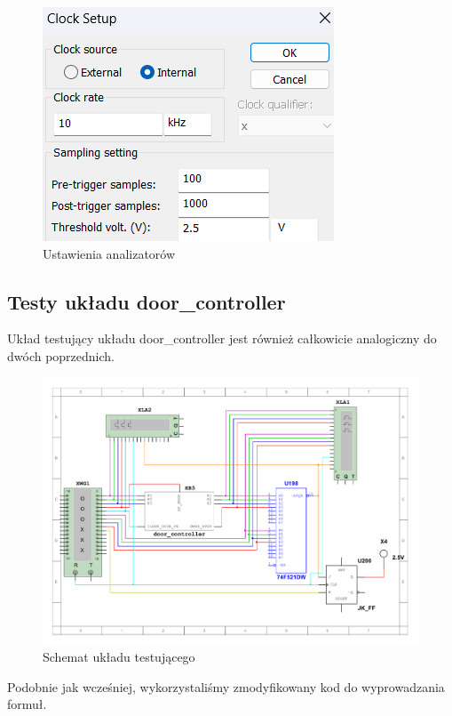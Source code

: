 \documentclass[a4paper]{article}
\begin{document}
\begin{figure}[H]
    \centering
    \includegraphics{direction_controller_test_logic_analizer_settings.png}
    \caption{Ustawienia analizatorów}
\end{figure}


\subsection{Testy układu door\_controller}
Układ testujący układu door\_controller jest również całkowicie analogiczny do dwóch poprzednich.

\begin{figure}[H]
    \centering
    \includegraphics[width=\textwidth]{component_test_door_controller.pdf}
    \caption{Schemat układu testującego}
\end{figure}

Podobnie jak wcześniej, wykorzystaliśmy zmodyfikowany kod do wyprowadzania formuł.
\end{document}
